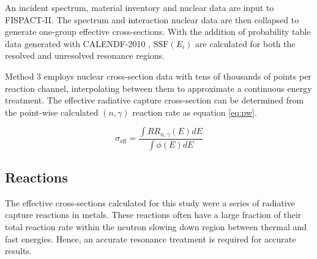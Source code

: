 An incident spectrum, material inventory and nuclear data are input to FISPACT-II. The spectrum and interaction nuclear data are then collapsed to generate one-group effective cross-sections. With the addition of probability table data generated with CALENDF-2010 \cite{sublet2011}, $\mathrm{SSF}(E_i)$ are calculated for both the resolved and unresolved resonance regions.

Method 3 employs nuclear cross-section data with tens of thousands of points per reaction channel, interpolating between them to approximate a continuous energy treatment. The effective radiative capture cross-section can be determined from the point-wise calculated $(n,\gamma)$ reaction rate as equation \ref{eq:pw}. 

\begin{equation}
\label{eq:pw}
\sigma_\mathrm{eff} = \frac{\int RR_{n,\gamma}(E) dE}{\int \phi(E) dE}
\end{equation}

\subsection{Reactions}

The effective cross-sections calculated for this study were a series of radiative capture reactions in metals. These reactions often have a large fraction of their total reaction rate within the neutron slowing down region between thermal and fast energies. Hence, an accurate resonance treatment is required for accurate results. 

